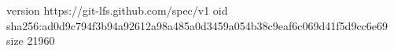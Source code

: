 version https://git-lfs.github.com/spec/v1
oid sha256:ad0d9c794f3b94a92612a98a485a0d3459a054b38c9eaf6c069d41f5d9cc6e69
size 21960
